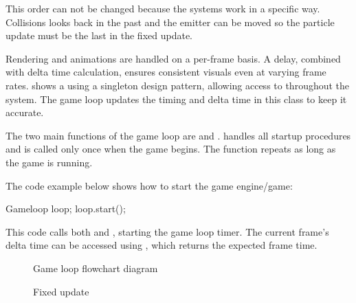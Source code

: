 \documentclass{projdoc}
\begin{document}
This order can not be changed because the systems work in a specific way. Collisions
looks back in the past and the emitter can be moved so the particle update must be
the last in the fixed update.

Rendering and animations are handled on a per-frame basis. A delay, combined with
delta time calculation, ensures consistent visuals even at varying frame rates.
 shows a  using a singleton design
pattern, allowing access to  throughout the system. The game
loop updates the timing and delta time in this class to keep it accurate.

The two main functions of the game loop are  and
.  handles all startup procedures and is
called only once when the game begins. The  function repeats as
long as the game is running.

The code example below shows how to start the game engine/game:\noparbreak
\begin{blockcode}
Gameloop loop;
loop.start();
\end{blockcode}

This code calls both  and , starting the game
loop timer. The current frame’s delta time can be accessed using
, which returns the expected
frame time.

\begin{figure}
	\centering
	\caption{Game loop flowchart diagram}
	\label{fig:gameloop-flow}
\end{figure}

\begin{figure}
	\centering
	\caption{Fixed update}
	\label{fig:fixed-update}
\end{figure}
\end{document}
